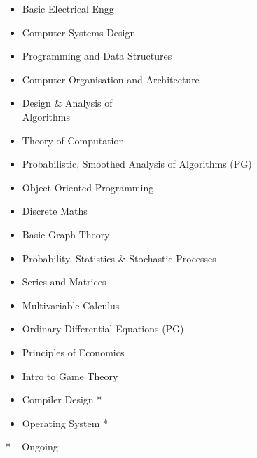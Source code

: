 \documentclass[10pt,article]{article}
\newcommand{\myMargin}{0.2in}
\begin{document}
\begin{multicols*}{2}
\begin{multicols}{2}
\begin{itemize}[ leftmargin=\myMargin]
    \setlength \itemsep{-0.2em}
  \item { Basic Electrical Engg} 
  \item { Computer Systems Design} 
  \item {Programming and Data Structures}
  \item { Computer Organisation and Architecture} 
  \item { Design \& Analysis of  \\ Algorithms} 
  \item { Theory of Computation} 
  \item { Probabilistic, Smoothed Analysis of Algorithms (PG)} 
  \item { Object Oriented Programming} 
  \item { Discrete Maths} 
  \item { Basic Graph Theory} 
  \item { Probability, Statistics \& Stochastic Processes} 
  \item { Series and Matrices} 
  \item { Multivariable Calculus} 
  \item { Ordinary Differential Equations (PG)}  
  \item { Principles of Economics} 
  \item { Intro to Game Theory}   
  \item { Compiler Design *} 
  \item { Operating System *}
\end{itemize}
\hfill  {* ~ Ongoing}

\end{multicols}


\end{multicols*}
\end{document}
